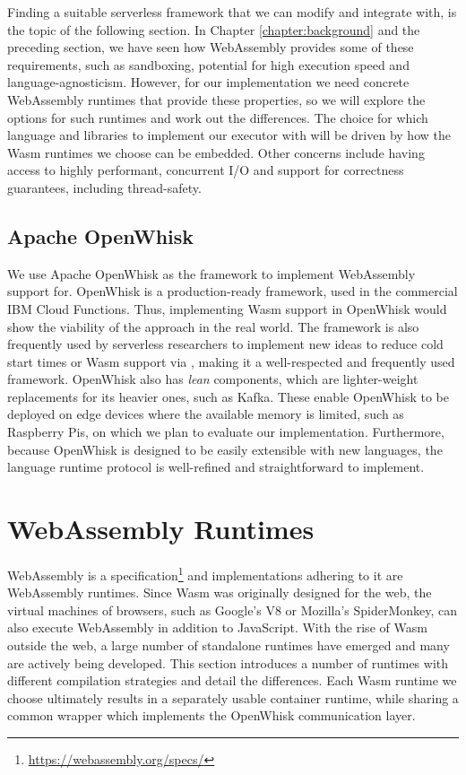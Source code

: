Finding a suitable serverless framework that we can modify and integrate with, is the topic of the following section. In Chapter \ref{chapter:background} and the preceding section, we have seen how WebAssembly provides some of these requirements, such as sandboxing, potential for high execution speed and language-agnosticism. However, for our implementation we need concrete WebAssembly runtimes that provide these properties, so we will explore the options for such runtimes and work out the differences. The choice for which language and libraries to implement our executor with will be driven by how the Wasm runtimes we choose can be embedded. Other concerns include having access to highly performant, concurrent I/O and support for correctness guarantees, including thread-safety.

\subsection{Apache OpenWhisk}

We use Apache OpenWhisk as the framework to implement WebAssembly support for. OpenWhisk is a production-ready framework, used in the commercial IBM Cloud Functions. Thus, implementing Wasm support in OpenWhisk would show the viability of the approach in the real world. The framework is also frequently used by serverless researchers to implement new ideas to reduce cold start times \cite{Mohan2019} or Wasm support via  \cite{Hall2019}, making it a well-respected and frequently used framework. OpenWhisk also has \emph{lean} components, which are lighter-weight replacements for its heavier ones, such as Kafka. These enable OpenWhisk to be deployed on edge devices where the available memory is limited, such as Raspberry Pis, on which we plan to evaluate our implementation. Furthermore, because OpenWhisk is designed to be easily extensible with new languages, the language runtime protocol is well-refined and straightforward to implement.

\section{WebAssembly Runtimes}
\label{section:wasm-runtimes}

WebAssembly is a specification\footnote{\url{https://webassembly.org/specs/}} and implementations adhering to it are WebAssembly runtimes. Since Wasm was originally designed for the web, the virtual machines of browsers, such as Google's V8 or Mozilla's SpiderMonkey, can also execute WebAssembly in addition to JavaScript. With the rise of Wasm outside the web, a large number of standalone runtimes have emerged and many are actively being developed. This section introduces a number of runtimes with different compilation strategies and detail the differences. Each Wasm runtime we choose ultimately results in a separately usable container runtime, while sharing a common wrapper which implements the OpenWhisk communication layer.


